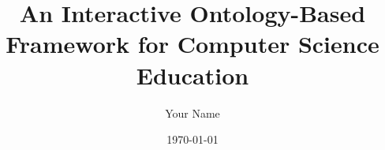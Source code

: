 \title{An Interactive Ontology-Based Framework for Computer Science Education}
\author{Your Name}
\date{\today}

\newcommand{\KnowledgeAtlas}{\textit{Knowledge Atlas}}
\newcommand{\AlgorithmicaApp}{\textit{Algorithmica}}
\newcommand{\DisciplinaApp}{\textit{Disciplina}}
\newcommand{\LandingPageService}{\textit{Landing Page}}
\newcommand{\KnowledgePlatformVision}{%
The framework exposes a shared knowledge API and a family of client-facing services. Each service assembles lesson plans by selecting an ordered subset of concepts from the common concept network: the web application emphasizes course-oriented pathways, the mobile applications emphasize gamified progression, and the landing page explains the service portfolio to prospective clients.%
}


